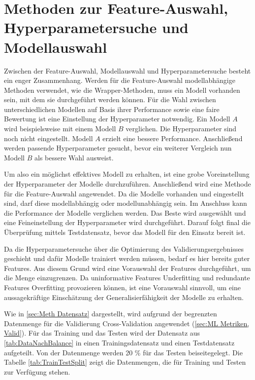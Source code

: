 \section{Methoden zur Feature-Auswahl, Hyperparametersuche und Modellauswahl} \label{sec:Meth FeatHypModSelect}
Zwischen der Feature-Auswahl, Modellauswahl und Hyperparametersuche besteht ein enger Zusammenhang. Werden für die Feature-Auswahl modellabhängige Methoden verwendet, wie die Wrapper-Methoden, muss ein Modell vorhanden sein, mit dem sie durchgeführt werden können. Für die Wahl zwischen unterschiedlichen Modellen auf Basis ihrer Performance sowie eine faire Bewertung ist eine Einstellung der Hyperparameter notwendig. Ein Modell \(A\) wird beispielsweise mit einem Modell \(B\) verglichen. Die Hyperparameter sind noch nicht eingestellt. Modell \(A\) erzielt eine bessere Performance. Anschließend werden passende Hyperparameter gesucht, bevor ein weiterer Vergleich nun Modell \(B\) als bessere Wahl ausweist. \par

Um also ein möglichst effektives Modell zu erhalten, ist eine grobe Voreinstellung der Hyperparameter der Modelle durchzuführen. Anschließend wird eine Methode für die Feature-Auswahl angewendet. Da die Modelle vorhanden und eingestellt sind, darf diese modellabhängig oder modellunabhängig sein. Im Anschluss kann die Performance der Modelle verglichen werden. Das Beste wird ausgewählt und eine Feineinstellung der Hyperparameter wird durchgeführt. Darauf folgt final die Überprüfung mittels Testdatensatz, bevor das Modell für den Einsatz bereit ist.\par

Da die Hyperparametersuche über die Optimierung des Validierungsergebnisses geschieht und dafür Modelle trainiert werden müssen, bedarf es hier bereits guter Features. Aus diesem Grund wird eine Vorauswahl der Features durchgeführt, um die Menge einzugrenzen. Da uninformative Features Underfitting und redundante Features Overfitting provozieren können, ist eine Vorauswahl sinnvoll, um eine aussagekräftige Einschätzung der Generalisierfähigkeit der Modelle zu erhalten. \par

Wie in \autoref{sec:Meth Datensatz} dargestellt, wird aufgrund der begrenzten Datenmenge für die Validierung Cross-Validation angewendet (\autoref{sec:ML Metriken, Valid}). Für das Training und das Testen wird der Datensatz aus \autoref{tab:DataNachBalance} in einen Trainingsdatensatz und einen Testdatensatz aufgeteilt. Von der Datenmenge werden 20 \% für das Testen beiseitegelegt. Die Tabelle \ref{tab:TrainTestSplit} zeigt die Datenmengen, die für Training und Testen zur Verfügung stehen.


